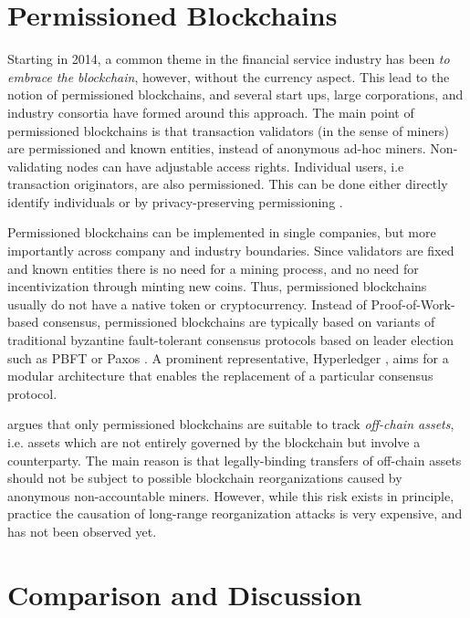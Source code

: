\section{Permissioned Blockchains}

Starting in 2014, a common theme in the financial service industry has been \emph{to embrace the blockchain}, however, without the currency aspect. This lead to the notion of permissioned blockchains, and several start ups, large corporations, and industry consortia have formed around this approach. The main point of permissioned blockchains is that transaction validators (in the sense of miners) are permissioned and known entities, instead of anonymous ad-hoc miners. Non-validating nodes can have adjustable access rights. Individual users, i.e transaction originators, are also permissioned. This can be done either directly identify individuals or by privacy-preserving permissioning \parencite{hardjono2016chain,Hardjono:2016:CCC:2899007.2899012}.

Permissioned blockchains can be implemented in single companies, but more importantly across company and industry boundaries. Since validators are fixed and known entities there is no need for a mining process, and no need for incentivization through minting new coins. Thus, permissioned blockchains usually do not have a native token or cryptocurrency. Instead of Proof-of-Work-based consensus, permissioned blockchains are typically based on variants of traditional byzantine fault-tolerant consensus protocols based on leader election such as PBFT \parencite{castro1999practical} or Paxos \parencite{lamport2001paxos}. A prominent representative, Hyperledger \parencite{cachin2016architecture}, aims for a modular architecture that enables the replacement of a particular consensus protocol.

\cite{swanson2015consensus} argues that only permissioned blockchains are suitable to track \emph{off-chain assets}, i.e. assets which are not entirely governed by the blockchain but involve a counterparty. The main reason is that legally-binding transfers of off-chain assets should not be subject to possible blockchain reorganizations caused by anonymous non-accountable miners. However, while this risk exists in principle, practice the causation of long-range reorganization attacks is very expensive, and has not been observed yet.


\section{Comparison and Discussion}

